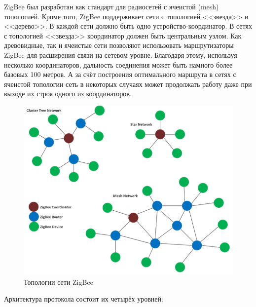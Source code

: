 	ZigBee был разработан как стандарт для радиосетей с ячеистой (mesh) топологией.
	Кроме того, ZigBee поддерживает сети с топологией <<звезда>> и <<дерево>>. В каждой 
	сети должно быть одно устройство-координатор. В сетях с топологией <<звезда>> координатор должен 
	быть центральным узлом. Как древовидные, так и ячеистые сети позволяют использовать маршрутизаторы 
	ZigBee для расширения связи на сетевом уровне. Благодаря этому, используя несколько координаторов,
	дальность соединения может быть намного более базовых 100 метров. А за счёт построения оптимального
	маршрута в сетях с ячеистой топологии сеть в некоторых случаях может продолжать работу даже
	при выходе их строя одного из координаторов.
	
	\begin{figure}[h]
		\centering
		\includegraphics[scale=0.6]{resources/ZigBee-network-topologies}
		\caption{Топологии сети ZigBee}
		\label{fig1.1}
	\end{figure}

	Архитектура протокола состоит их четырёх уровней:
	

